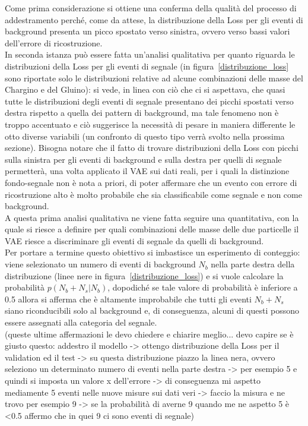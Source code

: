 Come prima considerazione si ottiene una conferma della qualità del processo di addestramento perché, come da attese, la distribuzione della Loss per gli eventi di background presenta un picco spostato verso sinistra, ovvero verso bassi valori dell'errore di ricostruzione. \\ 
In seconda istanza può essere fatta un'analisi qualitativa per quanto riguarda le distribuzioni della Loss per gli eventi di segnale (in figura~\ref{distribuzione_loss} sono riportate solo le distribuzioni relative ad alcune combinazioni delle masse del Chargino e del Gluino): si vede, in linea con ciò che ci si aspettava, che quasi tutte le distribuzioni degli eventi di segnale presentano dei picchi spostati verso destra rispetto a quella dei pattern di background, ma tale fenomeno non è troppo accentuato e ciò suggerisce la necessità di pesare in maniera differente le otto diverse variabili (un confronto di questo tipo verrà svolto nella prossima sezione). Bisogna notare che il fatto di trovare distribuzioni della Loss con picchi sulla sinistra per gli eventi di background e sulla destra per quelli di segnale permetterà, una volta applicato il VAE sui dati reali, per i quali la distinzione fondo-segnale non è nota a priori, di poter affermare che un evento con errore di ricostruzione alto è molto probabile che sia classificabile come segnale e non come background. \\
A questa prima analisi qualitativa ne viene fatta seguire una quantitativa, con la quale si riesce a definire per quali combinazioni delle masse delle due particelle il VAE riesce a discriminare gli eventi di segnale da quelli di background.\\
Per portare a termine questo obiettivo si imbastisce un esperimento di conteggio: viene selezionato un numero di eventi di background $N_b$ nella parte destra della distribuzione (linee nere in figura~\ref{distribuzione_loss}) e si vuole calcolare la probabilità $p(N_b + N_s|N_b)$, dopodiché se tale valore di probabilità è inferiore a 0.5 allora si afferma che è altamente improbabile che tutti gli eventi $N_b + N_s$ siano riconducibili solo al background e, di conseguenza, alcuni di questi possono essere assegnati alla categoria del segnale. \\


\color{red} (queste ultime affermazioni le devo chiedere e chiarire meglio... devo capire se è giusto questo: addestro il modello -> ottengo distribuzione della Loss per il validation ed il test -> su questa distribuzione piazzo la linea nera, ovvero seleziono un determinato numero di eventi nella parte destra -> per esempio 5 e quindi si imposta un valore x dell'errore -> di conseguenza mi aspetto mediamente 5 eventi nelle nuove misure sui dati veri -> faccio la misura e ne trovo per esempio 9 -> se la probabilità di averne 9 quando me ne aspetto 5 è <0.5 affermo che in quei 9 ci sono eventi di segnale)
\color{black} 

